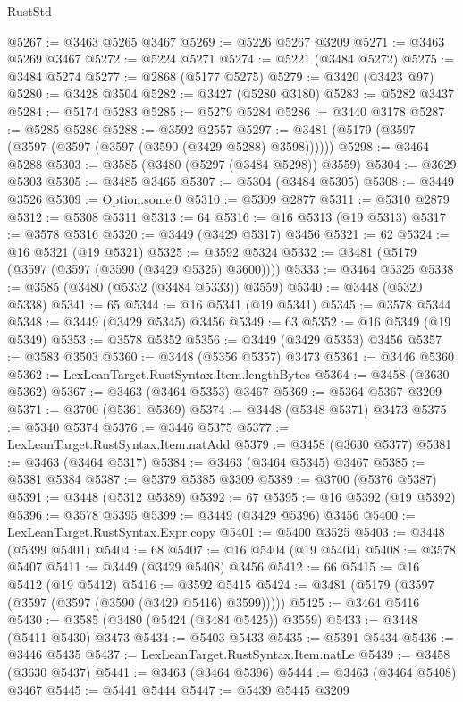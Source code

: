 \begin{lexlean}{RustStd}
\begin{coremodule}
{{{{{{{{{{{{{{{{{{{@5267 := @3463 @5265 @3467
@5269 := @5226 @5267 @3209
@5271 := @3463 @5269 @3467
@5272 := @5224 @5271
@5274 := @5221 (@3484 @5272)
@5275 := @3484 @5274
@5277 := @2868 (@5177 @5275)
@5279 := @3420 (@3423 @97)
@5280 := @3428 @3504
@5282 := @3427 (@5280 @3180)
@5283 := @5282 @3437
@5284 := @5174 @5283
@5285 := @5279 @5284
@5286 := @3440 @3178
@5287 := @5285 @5286
@5288 := @3592 @2557
@5297 := @3481 (@5179 (@3597 (@3597 (@3597 (@3597 (@3590 (@3429 @5288) @3598))))))
@5298 := @3464 @5288
@5303 := @3585 (@3480 (@5297 (@3484 @5298)) @3559)
@5304 := @3629 @5303
@5305 := @3485 @3465
@5307 := @5304 (@3484 @5305)
@5308 := @3449 @3526
@5309 := Option.some.{0}
@5310 := @5309 @2877
@5311 := @5310 @2879
@5312 := @5308 @5311
@5313 := 64
@5316 := @16 @5313 (@19 @5313)
@5317 := @3578 @5316
@5320 := @3449 (@3429 @5317) @3456
@5321 := 62
@5324 := @16 @5321 (@19 @5321)
@5325 := @3592 @5324
@5332 := @3481 (@5179 (@3597 (@3597 (@3590 (@3429 @5325) @3600))))
@5333 := @3464 @5325
@5338 := @3585 (@3480 (@5332 (@3484 @5333)) @3559)
@5340 := @3448 (@5320 @5338)
@5341 := 65
@5344 := @16 @5341 (@19 @5341)
@5345 := @3578 @5344
@5348 := @3449 (@3429 @5345) @3456
@5349 := 63
@5352 := @16 @5349 (@19 @5349)
@5353 := @3578 @5352
@5356 := @3449 (@3429 @5353) @3456
@5357 := @3583 @3503
@5360 := @3448 (@5356 @5357) @3473
@5361 := @3446 @5360
@5362 := LexLeanTarget.RustSyntax.Item.lengthBytes
@5364 := @3458 (@3630 @5362)
@5367 := @3463 (@3464 @5353) @3467
@5369 := @5364 @5367 @3209
@5371 := @3700 (@5361 @5369)
@5374 := @3448 (@5348 @5371) @3473
@5375 := @5340 @5374
@5376 := @3446 @5375
@5377 := LexLeanTarget.RustSyntax.Item.natAdd
@5379 := @3458 (@3630 @5377)
@5381 := @3463 (@3464 @5317)
@5384 := @3463 (@3464 @5345) @3467
@5385 := @5381 @5384
@5387 := @5379 @5385 @3309
@5389 := @3700 (@5376 @5387)
@5391 := @3448 (@5312 @5389)
@5392 := 67
@5395 := @16 @5392 (@19 @5392)
@5396 := @3578 @5395
@5399 := @3449 (@3429 @5396) @3456
@5400 := LexLeanTarget.RustSyntax.Expr.copy
@5401 := @5400 @3525
@5403 := @3448 (@5399 @5401)
@5404 := 68
@5407 := @16 @5404 (@19 @5404)
@5408 := @3578 @5407
@5411 := @3449 (@3429 @5408) @3456
@5412 := 66
@5415 := @16 @5412 (@19 @5412)
@5416 := @3592 @5415
@5424 := @3481 (@5179 (@3597 (@3597 (@3597 (@3590 (@3429 @5416) @3599)))))
@5425 := @3464 @5416
@5430 := @3585 (@3480 (@5424 (@3484 @5425)) @3559)
@5433 := @3448 (@5411 @5430) @3473
@5434 := @5403 @5433
@5435 := @5391 @5434
@5436 := @3446 @5435
@5437 := LexLeanTarget.RustSyntax.Item.natLe
@5439 := @3458 (@3630 @5437)
@5441 := @3463 (@3464 @5396)
@5444 := @3463 (@3464 @5408) @3467
@5445 := @5441 @5444
@5447 := @5439 @5445 @3209
}}}}}}}}}}}}}}}}}}}
\end{coremodule}
\end{lexlean}
